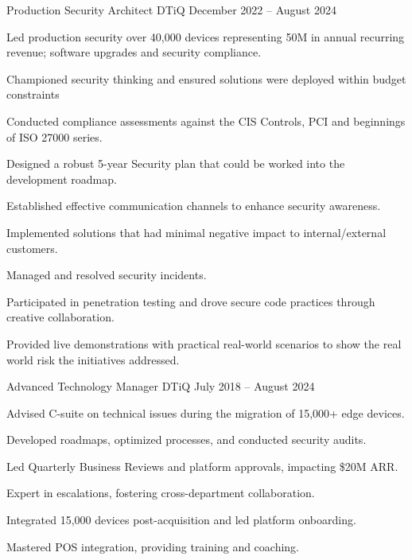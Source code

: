\documentclass[]{resume-format}
\begin{document}
\begin{cventries}
    \cventry
    { Production Security Architect }
    { DTiQ }
    {}
    { December 2022 – August 2024 }
    {\begin{cvitems}
        \item { Led production security over 40,000 devices representing 50M in annual recurring revenue; software upgrades and security compliance. }
        \item { Championed security thinking and ensured solutions were deployed within budget constraints }
        \item { Conducted compliance assessments against the CIS Controls, PCI and beginnings of ISO 27000 series. }
        \item { Designed a robust 5-year Security plan that could be worked into the development roadmap. }
        \item { Established effective communication channels to enhance security awareness. }
        \item { Implemented solutions that had minimal negative impact to internal/external customers. }
        \item { Managed and resolved security incidents. }
        \item { Participated in penetration testing and drove secure code practices through creative collaboration. }
        \item { Provided live demonstrations with practical real-world scenarios to show the real world risk the initiatives addressed. }
    \end{cvitems}}
    \cventry
    { Advanced Technology Manager }
    { DTiQ }
    {}
    { July 2018 – August 2024 }
    {\begin{cvitems}
        \item { Advised C-suite on technical issues during the migration of 15,000+ edge devices. }
        \item { Developed roadmaps, optimized processes, and conducted security audits. }
        \item { Led Quarterly Business Reviews and platform approvals, impacting \$20M ARR. }
        \item { Expert in escalations, fostering cross-department collaboration. }
        \item { Integrated 15,000 devices post-acquisition and led platform onboarding. }
        \item { Mastered POS integration, providing training and coaching. }

\end{cvitems}}
\end{cventries}
\end{document}
